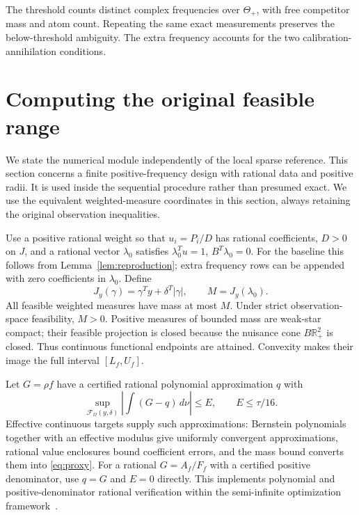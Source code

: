 \documentclass[10pt]{amsart}
\theoremstyle{definition}
\theoremstyle{remark}
\newcommand{\R}{\mathbb R}
\newcommand{\dd}{\,d}
\newcommand{\ThetaAll}{\Theta_+}
\newcommand{\F}{\mathcal F}
\begin{document}
The threshold counts distinct complex frequencies over $\ThetaAll$, with free competitor mass and atom count. Repeating the same exact measurements preserves the below-threshold ambiguity. The extra frequency accounts for the two calibration-annihilation conditions.


\section{Computing the original feasible range}\label{sec:cert}
We state the numerical module independently of the local sparse reference. This section concerns a finite positive-frequency design with rational data and positive radii. It is used inside the sequential procedure rather than presumed exact. We use the equivalent weighted-measure coordinates in this section, always retaining the original observation inequalities.

Use a positive rational weight so that $u_i=P_i/D$ has rational coefficients, $D>0$ on $J$, and a rational vector $\lambda_0$ satisfies $\lambda_0^Tu=1$, $B^T\lambda_0=0$. For the baseline this follows from Lemma~\ref{lem:reproduction}; extra frequency rows can be appended with zero coefficients in $\lambda_0$. Define
\[
 J_y(\gamma)=\gamma^Ty+\delta^T|\gamma|,\qquad M=J_y(\lambda_0).
\]
All feasible weighted measures have mass at most $M$. Under strict observation-space feasibility, $M>0$. Positive measures of bounded mass are weak-star compact; their feasible projection is closed because the nuisance cone $B\R_+^2$ is closed. Thus continuous functional endpoints are attained. Convexity makes their image the full interval $[L_f,U_f]$.

Let $G=\rho f$ have a certified rational polynomial approximation $q$ with
\begin{equation}\label{eq:proxy}
 \sup_{\F_\Omega(y,\delta)}\left|\int(G-q)\dd\nu\right|\le E,
 \qquad E\le\tau/16.
\end{equation}
Effective continuous targets supply such approximations: Bernstein polynomials together with an effective modulus give uniformly convergent approximations, rational value enclosures bound coefficient errors, and the mass bound converts them into \eqref{eq:proxy}. For a rational $G=A_f/F_f$ with a certified positive denominator, use $q=G$ and $E=0$ directly. This implements polynomial and positive-denominator rational verification within the semi-infinite optimization framework~\cite{papp}.
\end{document}
